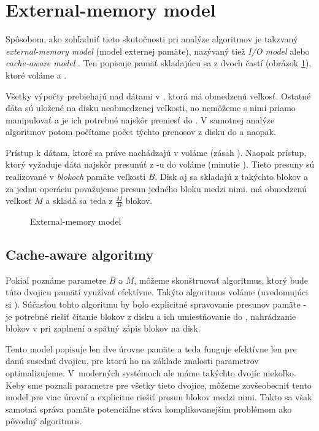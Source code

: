 \section{External-memory model} \label{sec:extmem}
Spôsobom, ako zohľadniť tieto skutočnosti pri analýze algoritmov je takzvaný \emph{external-memory model} (model externej pamäte), nazývaný tiež \emph{I/O model} alebo \emph{cache-aware model} \citep{aggarwal1988input}. Ten popisuje pamäť skladajúcu sa z dvoch častí (obrázok \ref{fig:exmem_model}), ktoré voláme \cache a \disk.

Všetky výpočty prebiehajú nad dátami v \cache, ktorá má obmedzenú veľkosť. Ostatné dáta sú uložené na disku neobmedzenej veľkosti, no nemôžeme s nimi priamo manipulovať a je ich potrebné najskôr preniesť do \cache. V samotnej analýze algoritmov potom počítame počet týchto prenosov z disku do \cache a naopak.

Prístup k dátam, ktoré sa práve nachádzajú v \cache voláme \hit (zásah \cache). Naopak prístup, ktorý vyžaduje dáta najskôr presunúť z \disk-u do \cache voláme \miss (minutie \cache). Tieto presuny sú realizované v \emph{blokoch} pamäte veľkosti $B$. Disk aj \cache sa skladajú z takýchto blokov a za jednu operáciu považujeme presun jedného bloku medzi nimi. \Cache má obmedzenú veľkosť $M$ a skladá sa teda z $\frac{M}{B}$ blokov.  

\begin{figure}
    \centering
    \resizebox{0.8\textwidth}{!}{%
            
    }
    \caption{External-memory model}
    \label{fig:exmem_model}
\end{figure}

\subsection{Cache-aware algoritmy}
Pokiaľ poznáme parametre $B$ a $M$, môžeme skonštruovať algoritmus, ktorý bude túto dvojicu pamätí využívať efektívne. Takýto algoritmus voláme \aware (uvedomujúci si \cache). Súčasťou tohto algoritmu by bolo explicitné spravovanie presunov pamäte - je potrebné riešiť čítanie blokov z disku a ich umiestňovanie do \cache, nahrádzanie blokov v \cache pri zaplnení a spätný zápis blokov na disk.


Tento model popisuje len dve úrovne pamäte a teda funguje efektívne len pre danú susednú dvojicu, pre ktorú ho na základe znalosti parametrov optimalizujeme. V~moderných systémoch ale máme takýchto dvojíc niekoľko. Keby sme poznali parametre pre všetky tieto dvojice, môžeme zovšeobecniť tento model pre viac úrovní a explicitne riešiť presun blokov medzi nimi. Takto sa však samotná správa pamäte potenciálne stáva komplikovanejším problémom ako pôvodný algoritmus.


